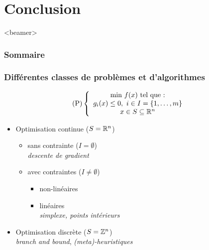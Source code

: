 \documentclass{beamer}
\newcommand{\Z}{{\ensuremath\mathbb{Z}}}
\newcommand{\R}{{\ensuremath\mathbb{R}}}
\begin{document}
\section{Conclusion}

\begin{frame}<beamer>
  \frametitle{Sommaire}
  \tableofcontents[currentsection]
\end{frame}

\begin{frame}
  \frametitle{Différentes classes de problèmes et d'algorithmes}

  \[
  \text{(P)} \left\{
  \begin{array}{c}
    \text{min} \ f(x) \ \text{tel que :} \\
    g_i(x) \leq 0, \ i \in I = \{1, \dots, m\} \\
    x \in S \subseteq \R^n
  \end{array}
  \right.
  \]

  \begin{itemize}
  \item Optimisation continue ($S = \R^n$)
    \begin{itemize}
    \item sans contrainte ($I = \emptyset$) \\
      \emph{descente de gradient}
    \item avec contraintes ($I \neq \emptyset$) 
      \begin{itemize}
        \item non-linéaires
        \item linéaires \\
        \emph{simplexe, points intérieurs}
      \end{itemize}
    \end{itemize}
  \item Optimisation discrète ($S = \Z^n$)\\
    \emph{branch and bound}, \emph{(meta)-heuristiques} 
  \end{itemize}
  
\end{frame}
\end{document}
